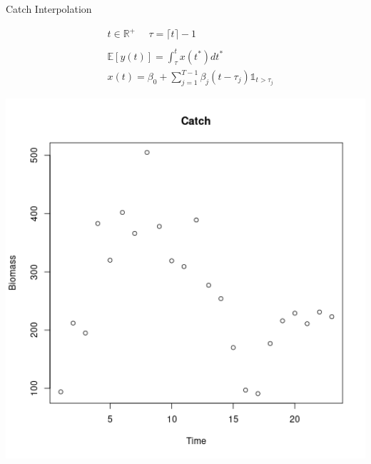 \documentclass[ xcolor = pdftex, dvipsnames, table ]{beamer}
\begin{document}
%
\begin{frame}{Catch Interpolation}
\begin{minipage}[h!]{0.49\textwidth}
\begin{align*}
&t\in\mathbb{R}^+ ~~~ ~~~ \tau=\lceil t \rceil-1\\
~\\
&\mathds{E}[y(t)] = \int_\tau^{t} x(t^*) dt^* \\%
&x(t) = \beta_0 + \sum_{j=1}^{T-1} \beta_j (t-\tau_j) \mathds{1}_{t>\tau_j}
\end{align*}
\end{minipage}
\begin{minipage}[h!]{0.49\textwidth}
\includegraphics[width=1.1\textwidth]{../plots/hakeCatch.png}
\end{minipage}
\end{frame}
\end{document}
